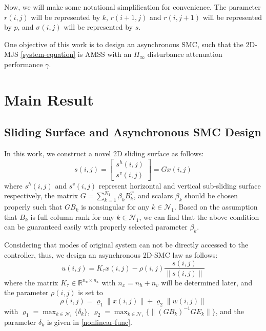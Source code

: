 \documentclass[conference]{IEEEtran}
\begin{document}
	Now, we will make some notational simplification for convenience. The parameter $r(i,j)$ will be represented by $k$, $r(i+1,j)$ and $r(i,j+1)$ will be represented by $p$, and $\sigma(i,j)$ will be represented by $s$. 
	
	
	
	 One objective of this work is to design an asynchronous  SMC, such that the 2D-MJS \eqref{system-equation} is AMSS with an $H_{\infty}$ disturbance attenuation performance $\gamma$. 

\section{Main Result}

\subsection{ Sliding Surface and Asynchronous SMC Design} \label{sliding-surface}
	In this work, we construct a novel 2D sliding surface as follows: 
	\begin{equation}\label{siding-surface-equation}	
		s(i,j) = \begin{bmatrix}
					s^{h}(i,j)\\
					s^{v}(i,j)
					\end{bmatrix}
			   = Gx(i,j)
	\end{equation}
	where $s^{h}(i,j)$ and $s^{v}(i,j)$ represent horizontal and vertical sub-sliding surface respectively, the matrix $G=\sum_{k=1}^{N_{1}}\beta_{k}B^{T}_{k}$, and scalars $\beta_{k}$ should be chosen properly such that $GB_{k}$ is nonsingular for any $k\in\mathcal{N}_{1}$. Based on the assumption that $B_{k}$ is full column rank for any $k\in\mathcal{N}_{1}$, we can find that the above condition can be guaranteed easily with properly selected parameter $\beta_{k}$. 
 	
 	Considering that modes of original system can not be directly accessed  to the controller,  thus, we design an asynchronous 2D-SMC law as follows:
	\begin{equation}\label{smc-law}
		u(i,j) = K_{\tau }x(i,j)-\rho(i,j)\frac{s(i,j)}{\|s(i,j)\|}
	\end{equation}
	where the matrix $K_{\tau }\in\mathbb{R}^{n_u\times n_x}$ with $n_x=n_h+n_v$ will be determined later, and the parameter $\rho(i,j)$ is set to
	\begin{equation}\label{varrho}
	\rho(i,j) = \varrho_{1}\|x(i,j)\| + \varrho_{2}\|w(i,j)\|
	\end{equation}
	with $\varrho_{1}=\max_{k\in\mathcal{N}_{1}} \{\delta_{k} \}$, $\varrho_{2} = \max_{k\in\mathcal{N}_{1}}\{\|(GB_{k})^{-1}GE_{k}\| \} $, and the parameter $\delta_{k}$ is given in \eqref{nonlinear-func}. 
	
\end{document}
